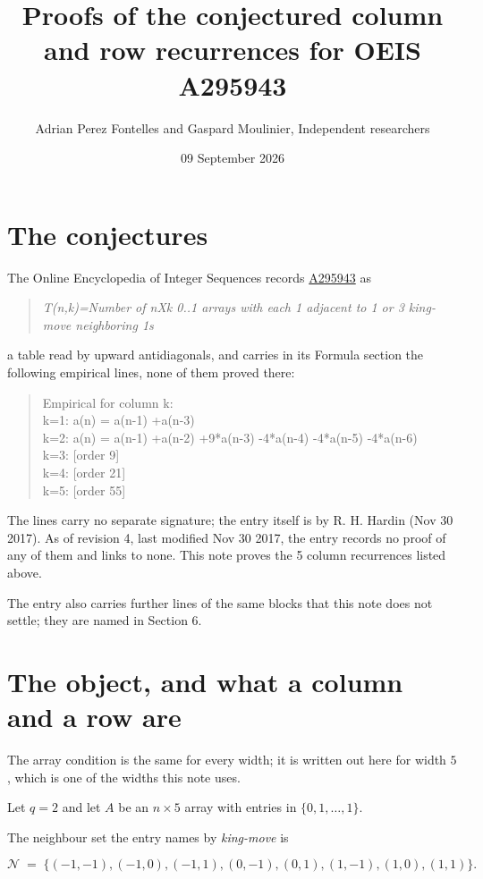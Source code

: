 \documentclass[11pt]{article}
\title{Proofs of the conjectured column and row recurrences for OEIS A295943}
\author{Adrian Perez Fontelles and Gaspard Moulinier, Independent researchers}
\date{09 September 2026}
\theoremstyle{definition}
\begin{document}
\maketitle
\section{The conjectures}

The Online Encyclopedia of Integer Sequences records \href{https://oeis.org/A295943}{A295943} as

\begin{quote}\itshape T(n,k)=Number of nXk 0..1 arrays with each 1 adjacent to 1 or 3 king-move neighboring 1s\end{quote}

a table read by upward antidiagonals, and carries in its Formula section the following empirical lines, none of them proved there:

\begin{quote}\ttfamily Empirical for column k:\\
k=1: a(n) = a(n-1) +a(n-3)\\k=2: a(n) = a(n-1) +a(n-2) +9*a(n-3) -4*a(n-4) -4*a(n-5) -4*a(n-6)\\k=3: [order 9]\\k=4: [order 21]\\k=5: [order 55]\end{quote}

The lines carry no separate signature; the entry itself is by R. H. Hardin (Nov 30 2017). As of revision 4, last modified Nov 30 2017, the entry records no proof of any of them and links to none. This note proves the 5 column recurrences listed above.

The entry also carries further lines of the same blocks that this note does not settle; they are named in Section 6.

\section{The object, and what a column and a row are}

The array condition is the same for every width; it is written out here for width $5$, which is one of the widths this note uses.

Let $q = 2$ and let $A$ be an $n \times 5$ array with entries in $\{0,1,\dots,1\}$.

The neighbour set the entry names by {\itshape king-move} is

\[\mathcal{N} \;=\; \{(-1,-1), (-1,0), (-1,1), (0,-1), (0,1), (1,-1), (1,0), (1,1)\}.\]
\end{document}
